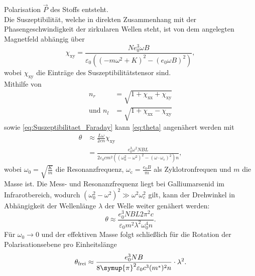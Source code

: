 Polarisation $\vec{P}$ des Stoffs entsteht.\\
Die Suszeptibilität, welche in direkten Zusammenhang mit der Phasengeschwindigkeit der zirkularen Wellen steht, ist von dem angelegten Magnetfeld abhängig über
\begin{equation}
    \chi_\text{xy} = \frac{Ne_0^3\omega B}{\varepsilon_0\left(\left(-m\omega^2+K\right)^2-\left(e_0\omega B\right)^2\right)},
    \label{eq:Suszeptibilitaet_Faraday}
\end{equation}
wobei $\chi_\text{xy}$ die Einträge des Suszeptibilitätstensor sind.\\
Mithilfe von 
\begin{align}
    n_r &= \sqrt{1+\chi_\text{xx}+\chi_\text{xy}} \\
     \text{und } n_l &= \sqrt{1+\chi_\text{xx}-\chi_\text{xy}}
\end{align}
sowie \autoref{eq:Suszeptibilitaet_Faraday} kann \autoref{eq:theta} angenähert werden mit 
\begin{align}
    \theta &\approx \frac{L\omega}{2cn}\chi_{\text{xy}} \label{eq:theta_rl_chi} \\
    &= \frac{e_0^3\omega^2 NBL} {2\varepsilon_0 cm^2\left(\left(\omega_0^2-\omega^2\right)^2-\left(\omega \cdot \omega_\text{c}\right)^2\right)n},
\end{align}
wobei $\omega_0 = \sqrt{\frac{K}{m}}$ die Resonanzfrequenz, $\omega_\text{c} = \frac{e_0B}{m}$ als Zyklotronfrequen und $m$ die Masse ist. Die Mess- und Resonanzfrequenz
liegt bei Galliumarsenid im Infrarotbereich, wodurch $\left(\omega_0^2 - \omega^2\right)^2 \gg \omega^2\omega_c^2$ gilt, kann der Drehwinkel in Abhängigkeit der Wellenlänge
$\lambda$ der Welle weiter genähert werden:
\begin{equation}
    \theta \approx \frac{e_0^3 NBL 2 \pi^2 c}{\varepsilon_0 m^2 \lambda^2 \omega_0^4 n}.
\end{equation}
Für $\omega_0 \rightarrow 0$ und der effektiven Masse folgt schließlich für die Rotation der Polarisationsebene pro Einheitslänge
\begin{equation}
    \label{eqn:t_frei}
    \theta_\text{frei} \approx \frac{e_0^3 N B}{8\symup{\pi}^2 \varepsilon_0 c^3 (m^*)^2 n} \cdot \lambda^2.
\end{equation}
